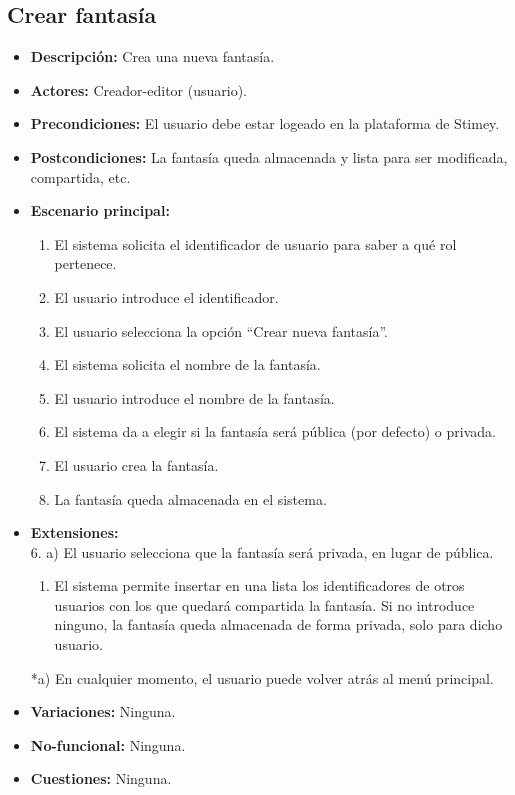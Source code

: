 \documentclass[12pt,letterpaper]{article}
\begin{document}
\subsection{Crear fantasía}
\begin{itemize}
	\item \textbf{Descripción:} Crea una nueva fantasía.
	\item \textbf{Actores:} Creador-editor (usuario).
	\item \textbf{Precondiciones:} El usuario debe estar logeado en la plataforma de Stimey.
	\item \textbf{Postcondiciones:} La fantasía queda almacenada y lista para ser modificada, compartida, etc.
	\item \textbf{Escenario principal:}
	\begin{enumerate}
		\item El sistema solicita el identificador de usuario para saber a qué rol pertenece.
		\item El usuario introduce el identificador.
		\item El usuario selecciona la opción ``Crear nueva fantasía''.
		\item El sistema solicita el nombre de la fantasía.
		\item El usuario introduce el nombre de la fantasía.
		\item El sistema da a elegir si la fantasía será pública (por defecto) o privada.
		\item El usuario crea la fantasía.
		\item La fantasía queda almacenada en el sistema.
	\end{enumerate}
	\item \textbf{Extensiones:} \\6. a) El usuario selecciona que la fantasía será privada, en lugar de pública.
	\begin{enumerate}
		\item El sistema permite insertar en una lista los identificadores de otros usuarios con los que quedará compartida la fantasía. Si no introduce ninguno, la fantasía queda almacenada de forma privada, solo para dicho usuario.
	\end{enumerate}
	*a) En cualquier momento, el usuario puede volver atrás al menú principal.
	\item \textbf{Variaciones:} Ninguna.
	\item \textbf{No-funcional:} Ninguna.
	\item \textbf{Cuestiones:} Ninguna.
\end{itemize}
\end{document}
